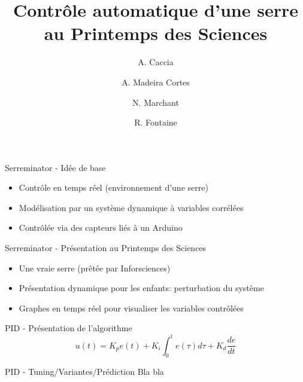 \documentclass{beamer}
\title{Contrôle automatique d'une serre au Printemps des Sciences}
\date{ }
\author{A. Caccia \and A. Madeira Cortes \and N. Marchant \and R. Fontaine}
\institute{Université Libre de Bruxelles}
\begin{document}
	\maketitle

		\begin{frame}{Serreminator - Idée de base}
			\begin{itemize}
        	\item Contrôle en temps réel (environnement d'une serre)
        	\item Modélisation par un système dynamique à variables corrélées
        	\item Contrôlée via des capteurs liés à un Arduino
      		\end{itemize}
		\end{frame}

		\begin{frame}{Serreminator - Présentation au Printemps des Sciences}
			\begin{itemize}
        	\item Une vraie serre (prêtée par Inforsciences)
        	\item Présentation dynamique pour les enfants: perturbation du système
        	\item Graphes en temps réel pour visualiser les variables contrôlées
      		\end{itemize}
		\end{frame}

		\begin{frame}{PID - Présentation de l'algorithme}
			$$u(t) = K_p e(t) + K_i \int_{0}^{t} e(\tau) d\tau + K_d \frac{de}{dt}$$
		\end{frame}

		\begin{frame}{PID - Tuning/Variantes/Prédiction}
			Bla bla
		\end{frame}
\end{document}
